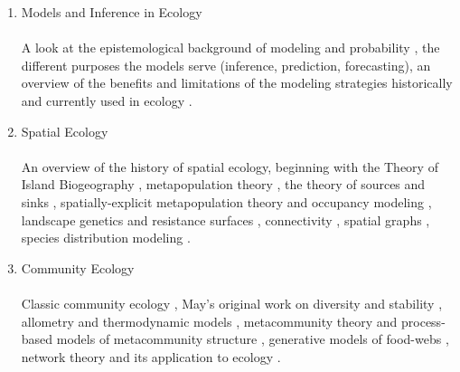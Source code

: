 \documentclass[]{article}
\begin{document}
\begin{enumerate}
    \item Models and Inference in Ecology \\ \hfill \\
        A look at the epistemological background of modeling and probability  \cite{jaynes_probability,crutchfield_semantics, pearl_causality}, the different purposes the models serve (inference, prediction, forecasting), an overview of the benefits and limitations of the modeling strategies historically and currently used in ecology \cite{whitlock2009analysis, mcelreath2020statistical}.
    \item Spatial Ecology \\ \hfill \\
        An overview of the history of spatial ecology, beginning with the Theory of Island Biogeography \cite{macarthur_theory_1969}, metapopulation theory \cite{levins_demographic_1969}, the theory of sources and sinks \cite{pulliam1988sources}, spatially-explicit metapopulation theory \cite{hanski_practical_1994, ovaskainen_metapopulation_2002} and occupancy modeling \cite{ howell2018increasing}, landscape genetics and resistance surfaces \cite{manel_landscape_2003, mcrae_isolation_2006, mcrae_using_2008, mcrae_isolation_2006, mcrae_using_2008}, connectivity \cite{taylor_connectivity_1993,kool_population_2013}, spatial graphs \cite{chubaty_r_2020,dale_graphs_2010,minor_graph-theory_2008, urban_landscape_2001},  species distribution modeling \cite{elith2009species, kissling2018building, pollock2014understanding}.
    \item Community Ecology
        \\ \hfill \\
        Classic community ecology \cite{hutchinson_homage_1959, macarthur_competition_1964, macarthur_patterns_1965, macarthur_limiting_1967,macarthur_species_1970,macarthur_theory_1969}, 
        May's original work on diversity and stability \cite{may_will_1972, may_stability_2001},
        allometry and thermodynamic models \cite{cohen_food_1977, yodzis_body_1992, brose_allometric_2006, stouffer_robust_2006, otto_allometric_2007, gravel_trophic_2011, delmas_simulations_2017}, metacommunity theory \cite{leibold_metacommunity_2004} and process-based models of metacommunity structure \cite{vellend_conceptual_2010}, generative models of food-webs \cite{cohen_food_1977,williams_simple_2000,allesina_general_2008,thompson_process-based_2020}, network theory  \cite{ clauset_finding_2004,newman_modularity_2006, olesen_modularity_2007,neutel_reconciling_2007,larremore_bipartite_sbm} and its application to ecology \cite{bascompte_nested_2003,bascompte_asymmetric_2006,allesina_stability_2012,allesina_predicting_2015, delmas_food_2020, Delmas2018, delmas_simulations_2017}.

\end{enumerate}
\end{document}
